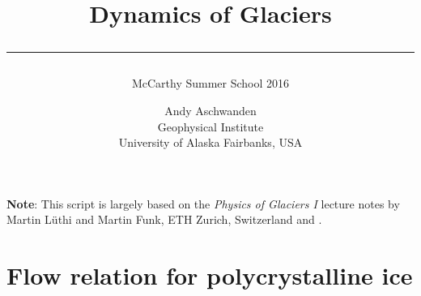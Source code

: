 \documentclass[11pt,halfparskip]{scrartcl}
\begin{document}
\title{Dynamics of Glaciers\\[.5em]
\rule[1.em]{\textwidth}{2pt}
\subtitle{McCarthy Summer School 2016}}

\date{}

\author{
  \small Andy Aschwanden\\[-.5em] 
  \small Geophysical Institute\\[-.5em] 
  \small University of Alaska Fairbanks, USA}


\maketitle

\textbf{Note}: This script is largely based on the \emph{Physics of
Glaciers I} lecture notes by Martin L\"uthi and Martin Funk, ETH
Zurich, Switzerland and \cite{GreveBlatter_disg}.

\vspace{1em}

\section{Flow relation for polycrystalline ice}
\label{sec:flow-law-ice}
\end{document}
